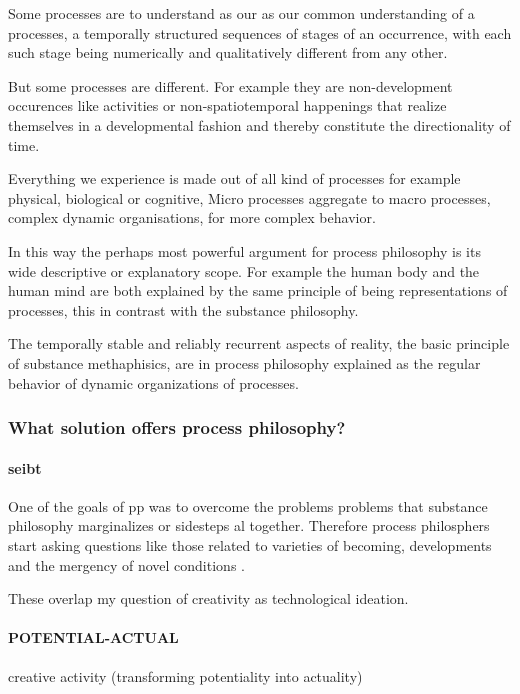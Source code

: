 Some processes are to understand as our as our common understanding of a processes, a temporally structured sequences of stages of an occurrence, with each such stage being numerically and qualitatively different from any other. 

But some processes are different. For example they are non-development occurences like activities or non-spatiotemporal happenings that realize themselves in a developmental fashion and thereby constitute the directionality of time. 

Everything we experience is made out of all kind of processes for example physical, biological or cognitive, Micro processes aggregate to macro processes, complex dynamic organisations, for more complex behavior. 

In this way the perhaps most powerful argument for process philosophy is its wide descriptive or explanatory scope. For example the human body and the human mind are both explained by the same principle of being representations of processes, this in contrast with the substance philosophy.

The temporally stable and reliably recurrent aspects of reality, the basic principle of substance methaphisics, are in process philosophy explained as the regular behavior of dynamic organizations of processes.




\subsubsection{What solution offers process philosophy?}
\paragraph{seibt}
One of the goals of pp was to overcome the problems problems that substance philosophy marginalizes or sidesteps al together. Therefore process philosphers start asking questions like those related to varieties of becoming, developments and the mergency of novel conditions \cite{seibt-2013-sep}.

These overlap my question of creativity as technological ideation.


\paragraph{ POTENTIAL-ACTUAL}
creative activity (transforming potentiality into actuality)

